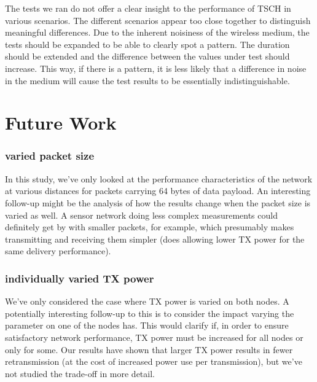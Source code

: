 \documentclass[conference]{IEEEtran}
\begin{document}
The tests we ran do not offer a clear insight to the performance of TSCH in various scenarios. The different scenarios appear too close together to distinguish meaningful differences. Due to the inherent noisiness of the wireless medium, the tests should be expanded to be able to clearly spot a pattern. The duration should be extended and the difference between the values under test should increase. This way, if there is a pattern, it is less likely that a difference in noise in the medium will cause the test results to be essentially indistinguishable. 

\section{Future Work}

\subsubsection{varied packet size}
In this study, we've only looked at the performance characteristics of the network at various distances for packets carrying 64 bytes of data payload. An interesting follow-up might be the analysis of how the results change when the packet size is varied as well. A sensor network doing less complex measurements could definitely get by with smaller packets, for example, which presumably makes transmitting and receiving them simpler (does allowing lower TX power for the same delivery performance). 

\subsubsection{individually varied TX power}
We've only considered the case where TX power is varied on both nodes. A potentially interesting follow-up to this is to consider the impact varying the parameter on one of the nodes has. This would clarify if, in order to ensure satisfactory network performance, TX power must be increased for all nodes or only for some. Our results have shown that larger TX power results in fewer retransmission (at the cost of increased power use per transmission), but we've not studied the trade-off in more detail.
\end{document}
